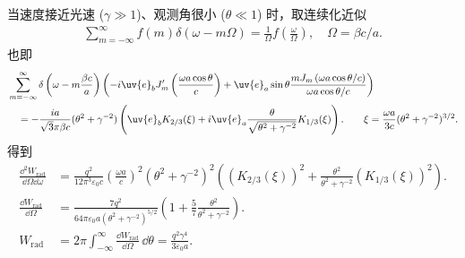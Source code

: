 \begin{exbox}
	当速度接近光速 (\(\gamma \gg 1\))、观测角很小 (\(\theta \ll 1\)) 时，取连续化近似
	\begin{align*}
		\sum_{m=-\infty}^{\infty} f(m) \delta(\omega - m \Omega) = \frac{1}{\Omega} f(\frac{\omega}{\Omega}), \quad \Omega = \beta c/a.
	\end{align*}
	也即
	\begin{align*}
		&\sum_{m=-\infty}^{\infty} \delta\left( \omega - m \frac{\beta c}{a} \right) \left( -i \uv{e}_{b} J_{m}'\left( \frac{\omega a \cos\theta}{c} \right) + \uv{e}_{a} \sin\theta \frac{m J_{m}\left(\omega a \cos\theta/c \right)}{\omega a \cos\theta/c} \right) \\&\quad= -\frac{i a}{\sqrt{3}\pi \beta c} (\theta^{2} + \gamma^{-2}) \left( \uv{e}_{b} K_{2/3}(\xi) + i \uv{e}_{a} \frac{\theta}{\sqrt{\theta^{2} + \gamma^{-2}}} K_{1/3}(\xi) \right). \qquad
		\xi = \frac{\omega a}{3c} (\theta^{2} + \gamma^{-2})^{3/2}.
	\end{align*}
	得到
	\begin{align*}
		\frac{\dd^{2} W_{\mathrm{rad}}}{\dd \Omega \dd \omega} &= \frac{q^{2}}{12\pi^{3} \varepsilon_{0} c} \left( \frac{\omega a}{c} \right)^{2} (\theta^{2} + \gamma^{-2})^{2} \left( (K_{2/3}(\xi))^{2} + \frac{\theta^{2}}{\theta^{2} + \gamma^{-2}} (K_{1/3}(\xi))^{2} \right). \\
		\frac{\dd  W_{\mathrm{rad}}}{\dd \Omega} &= \frac{7 q^{2}}{64\pi \varepsilon_{0} a (\theta^{2} + \gamma^{-2})^{5/2}} \left( 1 + \frac{5}{7} \frac{\theta^{2}}{\theta^{2} + \gamma^{-2}} \right). \\
		W_{\mathrm{rad}} &= 2\pi \int_{-\infty}^{\infty} \frac{\dd  W_{\mathrm{rad}}}{\dd \Omega} \, \dd \theta = \frac{q^{2} \gamma^{4}}{3 \varepsilon_{0} a}.
	\end{align*}
\end{exbox}

